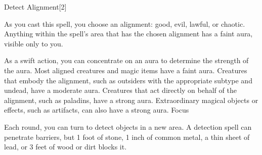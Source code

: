 \begin{spellsection}{Detect Alignment}[2]
    \begin{spellheader}
    \end{spellheader}
    \begin{spellcontent}
        \begin{spelltargetinginfo}
        \end{spelltargetinginfo}
        \begin{spelleffects}
            \spelleffect As you cast this spell, you choose an alignment: good, evil, lawful, or chaotic. Anything within the spell's area that has the chosen alignment has a faint aura, visible only to you.

            As a swift action, you can concentrate on an aura to determine the strength of the aura. Most aligned creatures and magic items have a faint aura. Creatures that embody the alignment, such as outsiders with the appropriate subtype and undead,  have a moderate aura. Creatures that act directly on behalf of the alignment, such as paladins, have a strong aura. Extraordinary magical objects or effects, such as artifacts, can also have a strong aura.
            \spelldur Focus
        \end{spelleffects}
    \end{spellcontent}
    \begin{spellfooter}
        \spellnotes Each round, you can turn to detect objects in a new area. A detection spell can penetrate barriers, but 1 foot of stone, 1 inch of common metal, a thin sheet of lead, or 3 feet of wood or dirt blocks it.
        \miscastexplode
    \end{spellfooter}
\end{spellsection}

